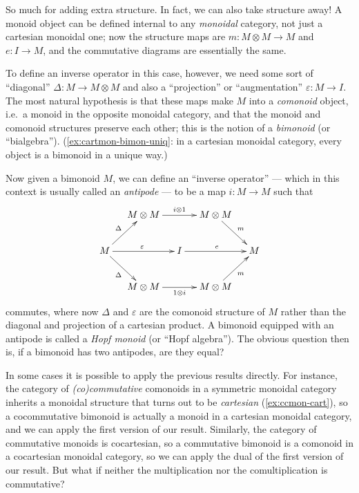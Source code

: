 \documentclass{book}
\begin{document}
So much for adding extra structure.
In fact, we can also take structure away!
A monoid object can be defined internal to any \emph{monoidal} category, not just a cartesian monoidal one; now the structure maps are $m:M\otimes M\to M$ and $e:I\to M$, and the commutative diagrams are essentially the same.

To define an inverse operator in this case, however, we need some sort of ``diagonal'' $\Delta:M\to M\otimes M$ and also a ``projection'' or ``augmentation'' $\varepsilon:M\to I$.
The most natural hypothesis is that these maps make $M$ into a \emph{comonoid} object, i.e.\ a monoid in the opposite monoidal category, and that the monoid and comonoid structures preserve each other; this is the notion of a \emph{bimonoid} (or ``bialgebra'').
(\cref{ex:cartmon-bimon-uniq}: in a cartesian monoidal category, every object is a bimonoid in a unique way.)

Now given a bimonoid $M$, we can define an ``inverse operator'' --- which in this context is usually called an \emph{antipode} --- to be a map $i:M\to M$ such that
\begin{equation}
  \vcenter{\xymatrix@C=1pc{& M\otimes M \ar[rr]^{i\otimes 1} && M\otimes M \ar[dr]^m \\
      M \ar[ur]^{\Delta} \ar[dr]_{\Delta} \ar[rr]^{\varepsilon} && I \ar[rr]^{e} && M \\
      & M\otimes M \ar[rr]_{1\otimes i} && M\otimes M \ar[ur]_{m}}}
\end{equation}
commutes, where now $\Delta$ and $\varepsilon$ are the comonoid structure of $M$ rather than the diagonal and projection of a cartesian product.
A bimonoid equipped with an antipode is called a \emph{Hopf monoid} (or ``Hopf algebra'').
The obvious question then is, if a bimonoid has two antipodes, are they equal?

In some cases it is possible to apply the previous results directly.
For instance, the category of \emph{(co)commutative} comonoids in a symmetric monoidal category inherits a monoidal structure that turns out to be \emph{cartesian} (\cref{ex:ccmon-cart}), so a cocommutative bimonoid is actually a monoid in a cartesian monoidal category, and we can apply the first version of our result.
Similarly, the category of commutative monoids is cocartesian, so a commutative bimonoid is a comonoid in a cocartesian monoidal category, so we can apply the dual of the first version of our result.
But what if neither the multiplication nor the comultiplication is commutative?
\end{document}

